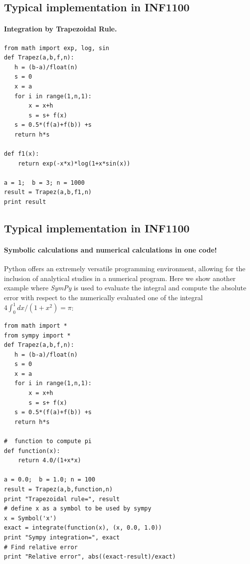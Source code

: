 \documentclass[%
twoside,                 %
final,                   %
10pt]{article}
\begin{document}
\noindent



\subsection*{Typical implementation in INF1100}

\paragraph{Integration by Trapezoidal Rule.}

\begin{verbatim}
from math import exp, log, sin
def Trapez(a,b,f,n):
   h = (b-a)/float(n)
   s = 0
   x = a
   for i in range(1,n,1):
       x = x+h
       s = s+ f(x)
   s = 0.5*(f(a)+f(b)) +s
   return h*s

def f1(x):
    return exp(-x*x)*log(1+x*sin(x))

a = 1;  b = 3; n = 1000
result = Trapez(a,b,f1,n)
print result
\end{verbatim}




\subsection*{Typical implementation in INF1100}

\paragraph{Symbolic calculations and numerical calculations in one code!}
Python offers an  extremely versatile programming  environment, allowing for the inclusion of analytical studies in a numerical program. Here we show another example
where \emph{SymPy} is used to evaluate the integral and compute the absolute error 
with respect to the numerically evaluated one of the integral
$4\int_0^1 dx/(1+x^2) = \pi$: 
\begin{verbatim}
from math import *
from sympy import *
def Trapez(a,b,f,n):
   h = (b-a)/float(n)
   s = 0
   x = a
   for i in range(1,n,1):
       x = x+h
       s = s+ f(x)
   s = 0.5*(f(a)+f(b)) +s
   return h*s

#  function to compute pi
def function(x):
    return 4.0/(1+x*x)

a = 0.0;  b = 1.0; n = 100
result = Trapez(a,b,function,n)
print "Trapezoidal rule=", result
# define x as a symbol to be used by sympy
x = Symbol('x')
exact = integrate(function(x), (x, 0.0, 1.0))
print "Sympy integration=", exact
# Find relative error
print "Relative error", abs((exact-result)/exact)
\end{verbatim}
\end{document}
